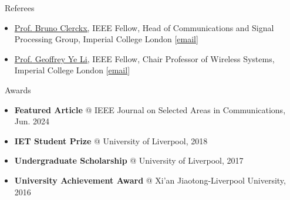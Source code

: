 \documentclass{cv}
\begin{document}
\vspace{-1.5em}

\begin{section}{\faQuoteLeft\ Referees}
	\begin{itemize}
		\item \href{https://profiles.imperial.ac.uk/b.clerckx}{Prof. Bruno Clerckx,} IEEE Fellow, Head of Communications and Signal Processing Group, Imperial College London [\href{mailto:b.clerckx@imperial.ac.uk}{email}]
		\item \href{https://profiles.imperial.ac.uk/geoffrey.li}{Prof. Geoffrey Ye Li,} IEEE Fellow, Chair Professor of Wireless Systems, Imperial College London [\href{mailto:geoffrey.li@imperial.ac.uk}{email}]
	\end{itemize}
\end{section}

\vspace{-1.5em}

\begin{section}{\faStar\ Awards}
	\begin{itemize}
		\item \textbf{Featured Article} @ IEEE Journal on Selected Areas in Communications, Jun. 2024
		\item \textbf{IET Student Prize} @ University of Liverpool, 2018
		\item \textbf{Undergraduate Scholarship} @ University of Liverpool, 2017
		\item \textbf{University Achievement Award} @ Xi'an Jiaotong-Liverpool University, 2016
	\end{itemize}
\end{section}

\end{document}
